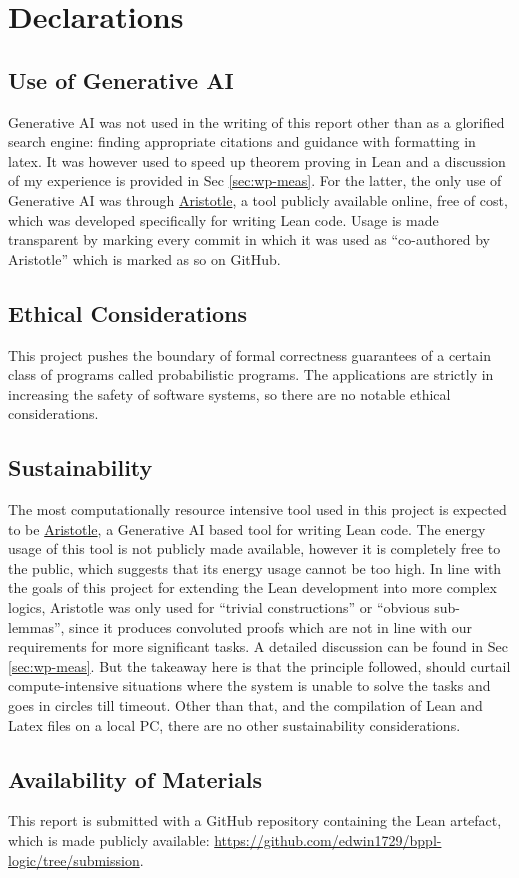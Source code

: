 \appendix
\chapter{Declarations}
\section{Use of Generative AI}
Generative AI was not used in the writing of this report other than as a glorified search engine:
finding appropriate citations and guidance with formatting in latex. It was however used to speed up theorem proving in Lean and a discussion of my experience is provided in Sec \ref{sec:wp-meas}.
For the latter, the only
use of Generative AI was through \href{https://aristotle.harmonic.fun/}{Aristotle}, a tool publicly available online, free of cost, which was developed specifically for writing Lean code.
Usage is made transparent by marking every commit in which it was used as ``co-authored by Aristotle'' which is marked as so on GitHub.

\section{Ethical Considerations}
This project pushes the boundary of formal correctness guarantees of a certain class of programs called probabilistic programs. The applications are strictly in increasing the safety of software systems,
so there are no notable ethical considerations.

\section{Sustainability}
The most computationally resource intensive tool used in this project is expected to be \href{https://aristotle.harmonic.fun/}{Aristotle}, a Generative AI based tool for writing Lean code.
The energy usage of this tool is not publicly made available, however it is completely free to the public, which suggests that its energy usage cannot be too high. In line with the goals of this
project for extending the Lean development into more complex logics, Aristotle was only used for ``trivial constructions'' or ``obvious sub-lemmas'', since it produces convoluted proofs which are not in line with our
requirements for more significant tasks. A detailed discussion can be found in Sec \ref{sec:wp-meas}. But the takeaway here is that the principle followed, should curtail compute-intensive situations
where the system is unable to solve the tasks and goes in circles till timeout. 
Other than that, and the compilation of Lean and Latex files on a local PC, there are no other sustainability considerations.

\section{Availability of Materials}
This report is submitted with a GitHub repository containing the Lean artefact, which is made publicly available: \url{https://github.com/edwin1729/bppl-logic/tree/submission}.